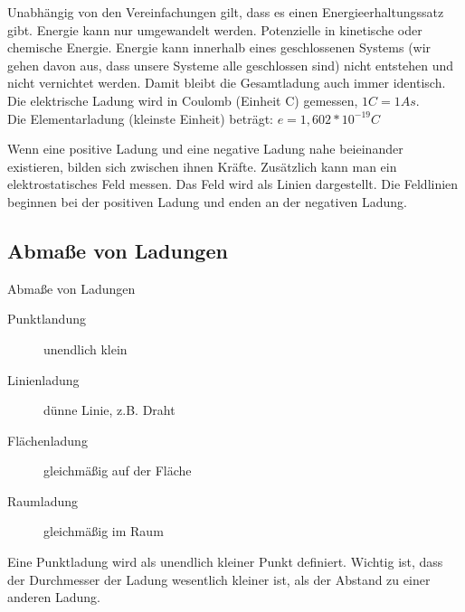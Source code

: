 Unabhängig von den Vereinfachungen gilt, dass es einen Energieerhaltungssatz gibt. Energie kann nur umgewandelt werden. Potenzielle in kinetische oder chemische Energie. Energie kann innerhalb eines geschlossenen Systems (wir gehen davon aus, dass unsere Systeme alle geschlossen sind) nicht entstehen und nicht vernichtet werden. Damit bleibt die Gesamtladung auch immer identisch. Die elektrische Ladung wird in Coulomb (Einheit C) gemessen, $1 C = 1 As$. \\ Die Elementarladung (kleinste Einheit) beträgt: $e = 1,602 * 10^{-19} C$

Wenn eine positive Ladung und eine negative Ladung nahe beieinander existieren, bilden sich zwischen ihnen Kräfte. Zusätzlich kann man ein elektrostatisches Feld messen. Das Feld wird als Linien dargestellt. Die Feldlinien beginnen bei der positiven Ladung und enden an der negativen Ladung.

\subsection[Ladungen]{Abmaße von Ladungen}
%

\begin{frame}{Abmaße von Ladungen}
  \begin{description}
    \item[Punktlandung] unendlich klein
    \item[Linienladung] dünne Linie, z.B. Draht
    \item[Flächenladung] gleichmäßig auf der Fläche
    \item[Raumladung] gleichmäßig im Raum
  \end{description}
\end{frame}
Eine Punktladung wird als unendlich kleiner Punkt definiert. Wichtig ist, dass der Durchmesser der Ladung wesentlich kleiner ist, als der Abstand zu einer anderen Ladung.

